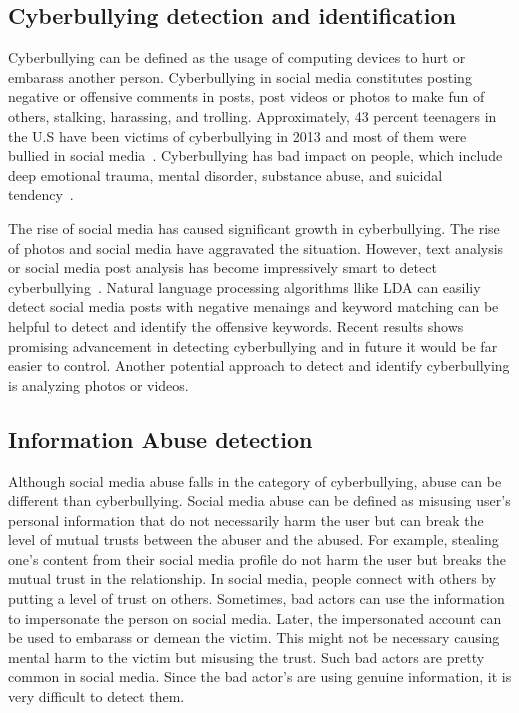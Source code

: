 \documentclass[sigconf]{acmart}
\begin{document}
\subsection{Cyberbullying detection and identification}
Cyberbullying can be defined as the usage of computing devices to hurt or embarass another person.  Cyberbullying in social media constitutes posting negative or offensive comments in posts, post videos or photos to make fun of others,  stalking, harassing, and trolling.  Approximately, 43 percent teenagers in the U.S have been victims of cyberbullying in 2013 and most of them were bullied in social media~\cite{cyberbullying}. Cyberbullying has bad impact on people, which include deep emotional trauma, mental disorder, substance abuse, and suicidal tendency~\cite{cb-effect}. 

The rise of social media has caused significant growth in cyberbullying. The rise of photos and social media have aggravated the situation. However, text analysis or social media post analysis has become impressively smart to detect cyberbullying~\cite{HosseinmardiMRH15}. Natural language processing algorithms llike LDA can easiliy detect social media posts with negative menaings and keyword matching can be helpful to detect and identify the offensive keywords. Recent results shows promising advancement in detecting cyberbullying and in future it would be far easier to control. Another potential approach to detect and identify cyberbullying is analyzing photos or videos.

\subsection{Information Abuse detection}
Although social media abuse falls in the category of cyberbullying, abuse can be different than cyberbullying. Social media abuse can be defined as misusing user's personal information that do not necessarily harm the user but can break the level of mutual trusts between the abuser and the abused. For example, stealing one's content from their social media profile do not harm the user but breaks the mutual trust in the relationship. In social media, people connect with others by putting a level of trust on others. Sometimes, bad actors can use the information to impersonate the person on social media. Later, the impersonated account can be used to embarass or demean the victim. This might not be necessary causing mental harm to the victim but misusing the trust. Such bad actors are pretty common in social media. Since the bad actor's are using genuine information, it is very difficult to detect them.
\end{document}
